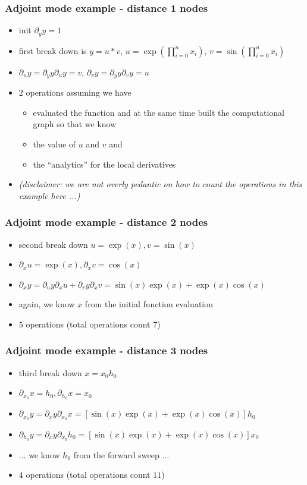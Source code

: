 \documentclass[10pt,German]{beamer}
\begin{document}
\begin{frame}[fragile]
\frametitle{Adjoint mode example - distance 1 nodes}
\begin{itemize}
\item init $\partial_y y = 1$
\item first break down is $y = u*v$, $u=\exp\left( \prod_{i=0}^n x_i \right)$, $v=\sin\left( \prod_{i=0}^n x_i \right)$
\item $\partial_u y = \partial_y y \partial _u y = v$, $\partial_v y = \partial_y y \partial _v y = u$
\item $2$ operations assuming we have
\begin{itemize}
\item evaluated the function and at the same time built the computational graph so that we know
\item the value of $u$ and $v$ and
\item the ``analytics'' for the local derivatives
\end{itemize}
\item \textit{(disclaimer: we are not overly pedantic on how to count the operations in this example here ...)}
\end{itemize}
\end{frame}

\begin{frame}[fragile]
\frametitle{Adjoint mode example - distance 2 nodes}
\begin{itemize}
\item second break down $u = \exp(x), v= \sin(x)$
\item $\partial_x u = \exp(x), \partial_x v = \cos(x)$
\item $\partial_x y = \partial_u y \partial_x u + \partial_v y \partial_x v = \sin(x)\exp(x)+\exp(x)\cos(x)$
\item again, we know $x$ from the initial function evaluation
\item $5$ operations (total operations count $7$)
\end{itemize}
\end{frame}

\begin{frame}[fragile]
\frametitle{Adjoint mode example - distance 3 nodes}
\begin{itemize}
\item third break down $x = x_0 h_0$
\item $\partial_{x_0} x = h_0, \partial_{h_0} x = x_0$
\item $\partial_{x_0} y = \partial_x y \partial_{x_0} x = [\sin(x)\exp(x)+\exp(x)\cos(x)] h_0$
\item $\partial_{h_0} y = \partial_x y \partial_{x_0} h_0 = [\sin(x)\exp(x)+\exp(x)\cos(x)] x_0$
\item ... we know $h_0$ from the forward sweep ...
\item $4$ operations (total operations count $11$)
\end{itemize}
\end{frame}
\end{document}

